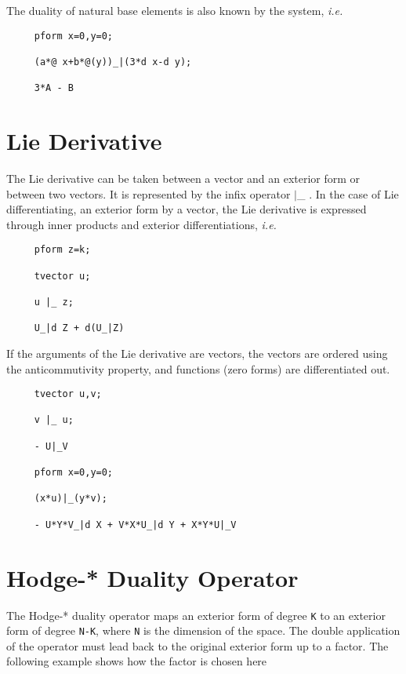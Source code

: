 The duality of natural base elements is also known by the system, {\em i.e.}

\begin{verbatim}
     pform x=0,y=0;

     (a*@ x+b*@(y))_|(3*d x-d y);

     3*A - B
\end{verbatim}

\section{Lie Derivative}

The Lie derivative can be taken between a vector and an exterior form
or between two vectors.  It is represented by the infix operator $|$\_
\label{lie}.  In the case of Lie differentiating, an exterior form by
a vector, the Lie derivative is expressed through inner products and
exterior differentiations, {\em i.e.} 

\begin{verbatim}
     pform z=k;

     tvector u;

     u |_ z;

     U_|d Z + d(U_|Z)
\end{verbatim}

If the arguments of the Lie derivative are vectors, the vectors are
ordered using the anticommutivity property, and functions (zero forms)
are differentiated out.

\example{}

\begin{verbatim}
     tvector u,v;

     v |_ u;

     - U|_V

     pform x=0,y=0;

     (x*u)|_(y*v);

     - U*Y*V_|d X + V*X*U_|d Y + X*Y*U|_V
\end{verbatim}

\section{Hodge-* Duality Operator}

 
The Hodge-*\label{hodge} duality operator maps an exterior form of degree
{\tt K} to an exterior form of degree {\tt N-K}, where {\tt N} is the
dimension of the space.  The double application of the operator must
lead back to the original exterior form up to a factor. The following
example shows how the factor is chosen here

